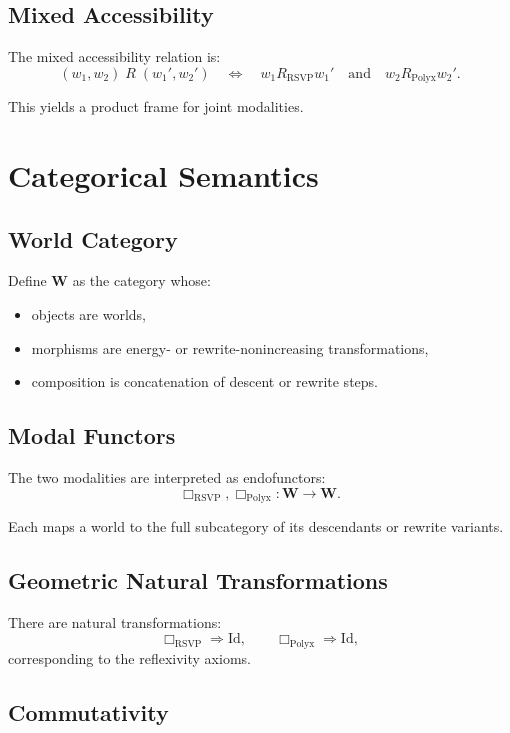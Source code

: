 \subsection{Mixed Accessibility}

The mixed accessibility relation is:
\[
(w_1,w_2) 
\;R\;
(w_1',w_2')
\quad\Longleftrightarrow\quad
w_1 R_{\mathrm{RSVP}} w_1'
\quad\text{and}\quad
w_2 R_{\mathrm{Polyx}} w_2'.
\]

This yields a product frame for joint modalities.

\section{Categorical Semantics}

\subsection{World Category}

Define $\mathbf{W}$ as the category whose:
\begin{itemize}
\item objects are worlds,
\item morphisms are energy- or rewrite-nonincreasing transformations,
\item composition is concatenation of descent or rewrite steps.
\end{itemize}

\subsection{Modal Functors}

The two modalities are interpreted as endofunctors:
\[
\Box_{\mathrm{RSVP}}, \Box_{\mathrm{Polyx}} : \mathbf{W} \to \mathbf{W}.
\]

Each maps a world to the full subcategory of its descendants or rewrite variants.

\subsection{Geometric Natural Transformations}

There are natural transformations:
\[
\Box_{\mathrm{RSVP}} \Longrightarrow \mathrm{Id},
\qquad
\Box_{\mathrm{Polyx}} \Longrightarrow \mathrm{Id},
\]
corresponding to the reflexivity axioms.

\subsection{Commutativity}

